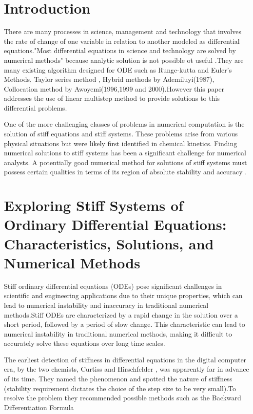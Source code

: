 \documentclass[a4paper, twoside]{report} %
\begin{document}
	\section{Introduction}
	There are many processes in science, management and technology that involves the rate of change of one variable in relation to another modeled as differential equations."Most differential equations in science and technology are solved by numerical methods"\cite{ross} because analytic solution is not possible ot useful \cite{lambert1977}.They are many existing algorithm designed for ODE such as Runge-kutta and Euler's Methods, Taylor series method \cite{lambert1977}, Hybrid methods by Ademiluyi(1987), Collocation method by Awoyemi(1996,1999 and 2000).However this paper addresses the use of linear multistep method to provide solutions to this differential problems.


	One of the more challenging classes of problems in numerical computation is the solution of stiff equations and stiff systems. These problems arise from various physical situations but were likely first identified in chemical kinetics. Finding numerical solutions to stiff systems has been a significant challenge for numerical analysts. A potentially good numerical method for solutions of stiff systems must possess certain qualities in terms of its region of absolute stability and accuracy \cite{QURESH2024}.




	\section{Exploring Stiff Systems of Ordinary Differential Equations: Characteristics, Solutions, and Numerical Methods}

	Stiff ordinary differential equations (ODEs) pose significant challenges in scientific and engineering applications due to their unique properties, which can lead to numerical instability and inaccuracy in traditional numerical methods.Stiff ODEs are characterized by a rapid change in the solution over a short period, followed by a period of slow change. This characteristic can lead to numerical instability in traditional numerical methods, making it difficult to accurately solve these equations over long time scales.

	The earliest detection of stiffness in differential equations in the digital computer era, by the two chemists, Curtiss and Hirschfelder \cite{curtisAndHirscfelder}, was apparently far in advance of its time. They named the phenomenon and spotted the nature of stiffness (stability requirement dictates the choice of the step size to be very small).To resolve the problem they recommended possible methods such as the Backward Differentiation Formula \cite{EMayers}
\end{document}

